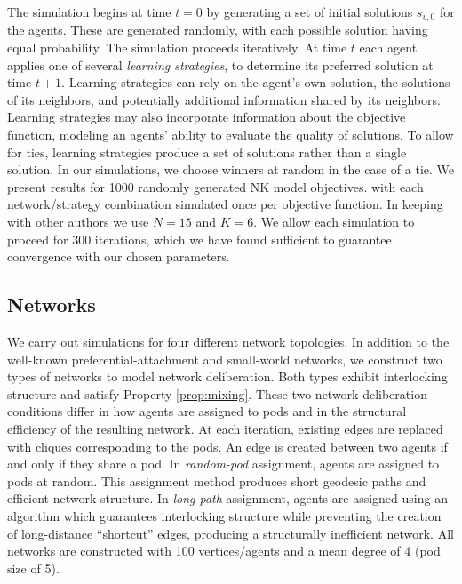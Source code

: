 The simulation begins at time $t=0$ by generating a set of initial solutions $s_{v,0}$ for the agents.
These are generated randomly, with each possible solution having equal probability.
The simulation proceeds iteratively.
At time $t$ each agent applies one of several {\em learning strategies}, to determine its preferred solution at time $t+1$.
Learning strategies can rely on the agent's own solution, the solutions of its neighbors, and potentially additional information shared by its neighbors.
Learning strategies may also incorporate information about the objective function, modeling an agents' ability to evaluate the quality of solutions.
To allow for ties, learning strategies produce a set of solutions rather than a single solution.
In our simulations, we choose winners at random in the case of a tie.
We present results for 1000 randomly generated NK model objectives.
with each network/strategy combination simulated once per objective function.
In keeping with other authors \cite{barkoczi_social_2016, lazer_network_2007} we use $N=15$ and $K=6$.
We allow each simulation to proceed for 300 iterations, which we have found sufficient to guarantee convergence with our chosen parameters.

\subsection{Networks}

We carry out simulations for four different network topologies. In addition to the well-known preferential-attachment \cite{barabasi_emergence_1999} and small-world \cite{watts_collective_1998} networks, we construct two types of networks to model network deliberation.
Both types exhibit interlocking structure and satisfy Property \ref{prop:mixing}.
These two network deliberation conditions differ in how agents are assigned to pods and in the structural efficiency of the resulting network.
At each iteration, existing edges are replaced with cliques corresponding to the pods. An edge is created between two agents if and only if they share a pod.
In {\em random-pod} assignment, agents are assigned to pods at random.
This assignment method produces short geodesic paths and efficient network structure.
In {\em long-path} assignment, agents are assigned using an algorithm which guarantees interlocking structure while preventing the creation of long-distance ``shortcut'' edges, producing a structurally inefficient network.
All networks are constructed with 100 vertices/agents and a mean degree of 4 (pod size of 5).

